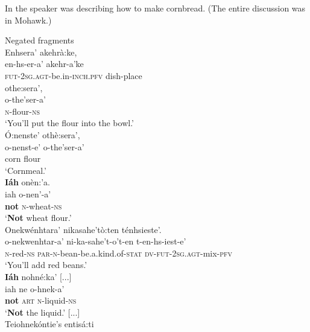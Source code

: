 \documentclass[output=paper,colorlinks,citecolor=brown]{langscibook}
\begin{document}
In  the speaker was describing how to make cornbread. (The entire discussion was in Mohawk.)

\ea\label{ex:moh:89}Negated fragments\\
    \ea\label{ex:moh:89a}
        \glll Enhsera’ akehrà:ke,  \\ 
                en-hs-er-a’						akehr-a’ke	 \\
                \textsc{fut-2sg.agt}-be.in-\textsc{inch.pfv} 	dish-place\\
        \glt 
        \glll othe:sera’, \\ 
                o-the’ser-a’ \\
                \textsc{n}-flour-\textsc{ns}\\
        \glt ‘You’ll put the flour into the bowl.’\\  
        \medskip
    \ex\label{ex:moh:89b}
        \glll Ó:nenste’ othè:sera’, \\
                o-nenst-e’	o-the’ser-a’ \\
             corn flour\\
        \glt ‘Cornmeal.’\\  \medskip
    \ex\label{ex:moh:89c}
        \glll \textbf{Iáh} onèn:’a. \\
                iah		o-nen’-a’ \\
             \textbf{not} \textsc{n}-wheat-\textsc{ns}  \\
        \glt ‘\textbf{Not} wheat flour.’ 
\\  \medskip
    \ex\label{ex:moh:89d}
        \glll Onekwénhtara’	nikasahe’tò:ten	ténhsieste’. \\
                o-nekwenhtar-a’	ni-ka-sahe’t-o’t-en	t-en-hs-iest-e’ \\
                \textsc{n}-red-\textsc{ns} \textsc{par-n}-bean-be.a.kind.of-\textsc{stat} \textsc{dv-fut-2sg.agt}-mix-\textsc{pfv} \\
        \glt ‘You’ll add red beans.’ \\  \medskip
    \ex\label{ex:moh:89e}
        \glll \textbf{Iáh} nohné:ka’ [...] \\ 
             iah	ne  o-hnek-a’ \\
            \textbf{not} \textsc{art} \textsc{n}-liquid-\textsc{ns}  \\ 
        \glt ‘\textbf{Not} the liquid.’ [...]\\  \medskip 
    \ex\label{ex:moh:89f}
        \glll Teiohnekóntie’s entisá:ti  \\
\end{document}
